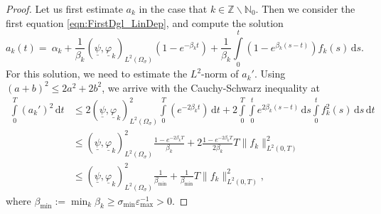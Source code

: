 \documentclass[a4paper,11pt]{article}
\newcommand{\N}{\mathbb N}
\newcommand{\Z}{\mathbb Z}
\newcommand{\intT}{\int\limits_{0}^T}
\newcommand{\omsig}{\Omega_{\sigma}}
\renewcommand{\vec}[1]{\underline{#1}}
\begin{document}
\begin{proof}
	Let us first estimate $ {a_k}$ in the case that $k\in \Z\backslash\N_0$. Then we consider the first equation \eqref{eqn:FirstDgl_LinDep}, and compute the solution  
	\[ {a_k}(t)=\ \alpha_k+ \frac{1}{\beta_k}  (\vec \psi,\vec \varphi_k)_{L^2(\omsig)} (1 -e^{-\beta_k t}) + \frac{1}{\beta_k }\int\limits_0^t(1- e^{\beta_k (s-t)})f_k(s)\,\mathrm ds. \]	
	For this solution, we need to estimate the $L^2$-norm of $ {a_k}'$. Using $(a+b)^2 \leq 2a^2 + 2 b^2$, we arrive with the Cauchy-Schwarz inequality at
	\begin{align}
		\nonumber
		\intT ( {a_k}')^2\,\mathrm dt &\leq2(\vec \psi,\vec \varphi_k)_{L^2(\omsig)}^2\intT (  e^{-2\beta_k t})\,\mathrm dt +   2 \intT   \int\limits_0^t e^{2\beta_k (s-t)}\,\mathrm ds\int\limits_0^t f_k^2(s)\,\mathrm ds \,\mathrm dt\\
		\nonumber
		&\leq(\vec \psi,\vec \varphi_k)_{L^2(\omsig)}^2\frac{1- e^{-2\beta_k T}}{\beta_k} +   2 \frac{1-e^{-2\beta_k T}}{2\beta_k}T \|f_k\|_{L^2(0,T)}^2\\
		\label{ineqn:kinJ}
		&\leq (\vec \psi,\vec \varphi_k)_{L^2(\omsig)}^2\frac{1}{\beta_{\min}} +   \frac{1}{\beta_{\min}}T \|f_k\|_{L^2(0,T)}^2,
	\end{align}
	where $\beta_{\min} := \min_k \beta_k\geq\sigma_{\min} \varepsilon_{\max}^{-1}>0$.
	

\end{proof}
\end{document}
